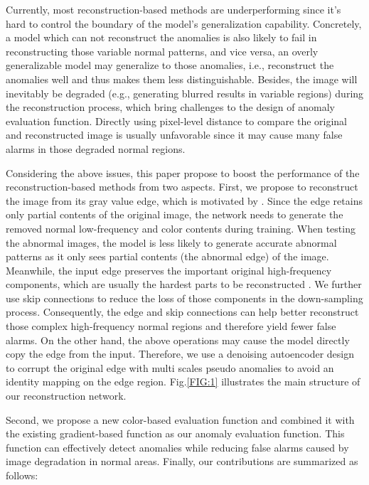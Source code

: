 \documentclass[5p, twocolumn]{elsarticle}[draft]
\begin{document}
Currently, most reconstruction-based methods are underperforming since it's hard to control the boundary of the model's generalization capability. Concretely, a model which can not reconstruct the anomalies is also likely to fail in reconstructing those variable normal patterns, and vice versa, an overly generalizable model may generalize to those anomalies, i.e., reconstruct the anomalies well and thus makes them less distinguishable. Besides, the image will inevitably be degraded (e.g., generating blurred results in variable regions) during the reconstruction process, which bring challenges to the design of anomaly evaluation function. Directly using pixel-level  distance to compare the original and reconstructed image is usually unfavorable since it may cause many false alarms in those degraded normal regions.

Considering the above issues, this paper propose to boost the performance of the reconstruction-based methods from two aspects. First, we propose to reconstruct the image from its gray value edge, which is motivated by \cite{fei2020attribute}. Since the edge retains only partial contents of the original image, the network needs to generate the removed normal low-frequency and color contents during training. When testing the abnormal images, the model is less likely to generate accurate abnormal patterns as it only sees partial contents (the abnormal edge) of the image. Meanwhile, the input edge preserves the important original high-frequency components, which are usually the hardest parts to be reconstructed \cite{jiang2021focal}. We further use skip connections to reduce the loss of those components in the down-sampling process. Consequently, the edge and skip connections can help better reconstruct those complex high-frequency normal regions and therefore yield fewer false alarms. On the other hand, the above operations may cause the model directly copy the edge from the input. Therefore, we use a denoising autoencoder design to corrupt the original edge with multi scales pseudo anomalies to avoid an identity mapping on the edge region. Fig.\ref{FIG:1} illustrates the main structure of our reconstruction network.

Second, we propose a new color-based evaluation function and combined it with the existing gradient-based function\cite{xue2013gradient,zavrtanik2021reconstruction} as our anomaly evaluation function. This function can effectively detect anomalies while reducing false alarms caused by image degradation in normal areas.
Finally, our contributions are summarized as follows:
\end{document}
